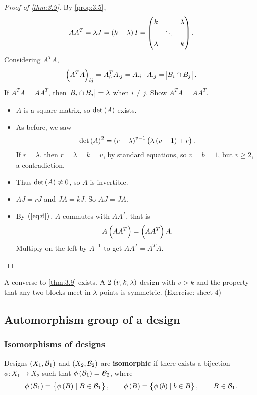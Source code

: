 \begin{proof}[Proof of \ref{thm:3.9}]
By \ref{prop:3.5},
\begin{equation}
\label{eq:6}
AA^T = \lambda J = \br{k - \lambda}I = \threebythree{k}{}{\lambda}{}{\ddots}{}{\lambda}{}{k}.
\end{equation}
Considering $ A^TA $,
$$ \br{A^TA}_{ij} = A_{i\cdot}^TA_{\cdot j} = A_{\cdot i} \cdot A_{\cdot j} = \abs{B_i \cap B_j}. $$
If $ A^TA = AA^T $, then $ \abs{B_i \cap B_j} = \lambda $ when $ i \ne j $. Show $ A^TA = AA^T $.
\begin{itemize}
\item $ A $ is a square matrix, so $ \det\br{A} $ exists.
\item As before, we saw
$$ \det\br{A}^2 = \br{r - \lambda}^{v - 1}\br{\lambda\br{v - 1} + r}. $$
If $ r = \lambda $, then $ r = \lambda = k = v $, by standard equations, so $ v = b = 1 $, but $ v \ge 2 $, a contradiction.
\item Thus $ \det\br{A} \ne 0 $, so $ A $ is invertible.
\item $ AJ = rJ $ and $ JA = kJ $. So $ AJ = JA $.
\item By $ \br{\ref{eq:6}} $, $ A $ commutes with $ AA^T $, that is
$$ A\br{AA^T} = \br{AA^T}A. $$
Multiply on the left by $ A^{-1} $ to get $ AA^T = A^TA $.
\end{itemize}
\end{proof}

\begin{note*}
A converse to \ref{thm:3.9} exists. A $ 2 $-$ \br{v, k, \lambda} $ design with $ v > k $ and the property that any two blocks meet in $ \lambda $ points is symmetric. (Exercise: sheet $ 4 $)
\end{note*}

\pagebreak

\subsection{Automorphism group of a design}

\subsubsection{Isomorphisms of designs}

\begin{definition*}
Designs $ \br{X_1, \BB_1} $ and $ \br{X_2, \BB_2} $ are \textbf{isomorphic} if there exists a bijection $ \phi : X_1 \to X_2 $ such that $ \phi\br{\BB_1} = \BB_2 $, where
$$ \phi\br{\BB_1} = \cbr{\phi\br{B} \mid B \in \BB_1}, \qquad \phi\br{B} = \cbr{\phi\br{b} \mid b \in B}, \qquad B \in \BB_1. $$
\end{definition*}


